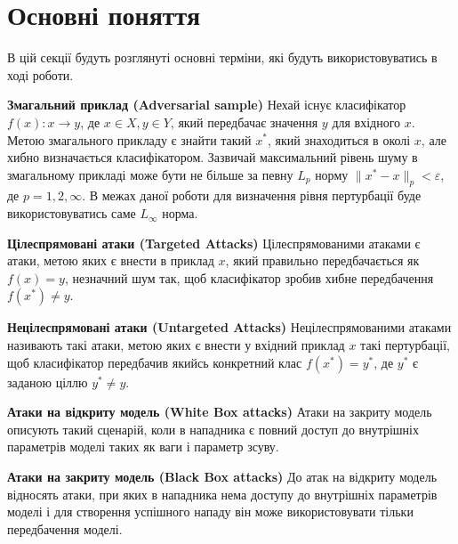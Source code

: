 \documentclass[a4paper,14pt]{extreport}
\begin{document}
	\section{Основні поняття}	
	В цій секції будуть розглянуті основні терміни, які будуть використовуватись в ході роботи.
	
	\textbf{Змагальний приклад (Adversarial sample)}
	\newline
	Нехай існує класифікатор $f(x):x\rightarrow y$, де  $x \in X, y \in Y$, який передбачає значення $y$ для вхідного $x$. Метою змагального прикладу є знайти такий $x^{*}$, який знаходиться в околі $x$, але хибно визначається класифікатором. Зазвичай максимальний рівень шуму в змагальному прикладі може бути не більше за певну $L_p$ норму $ \| x^{*} - x \|_p < \varepsilon $, де $p=1,2,\infty $. В межах даної роботи для визначення рівня пертурбації буде використовуватись саме $L_{\infty}$ норма.
	\newline \par
	\textbf{Цілеспрямовані атаки (Targeted Attacks)} \newline
	Цілеспрямованими атаками є атаки, метою яких є внести в приклад $x$, який правильно передбачається як $f(x) = y$, незначний шум так, щоб класифікатор зробив хибне передбачення $f(x^{*}) \neq y$.
	\newline \par
	\textbf{Нецілеспрямовані  атаки (Untargeted Attacks)} \newline
	Нецілеспрямованими атаками називають такі атаки, метою яких є внести у вхідний приклад $x$ такі пертурбації, щоб класифікатор передбачив якийсь конкретний клас $f(x^{*}) = y^{*}$, де $y^{*}$ є заданою ціллю $y^{*} \neq y$.
	\newline \par
	\textbf{Атаки на відкриту модель (White Box attacks)} \newline
	Атаки на закриту модель описують такий сценарій, коли в нападника є повний доступ до внутрішніх параметрів моделі таких як ваги і параметр зсуву.
	\newline \par
	\textbf{Атаки на закриту модель (Black Box attacks)} \newline
	До атак на відкриту модель відносять атаки, при яких в нападника нема доступу до внутрішніх параметрів моделі і для створення успішного нападу він може використовувати тільки передбачення моделі.

\end{document}
